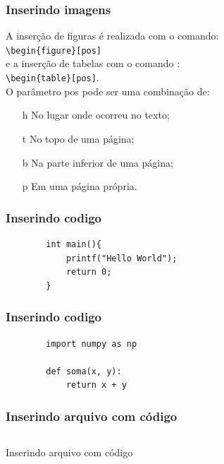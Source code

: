 \documentclass[compress]{beamer}
\newenvironment{code}{\captionsetup{type=listing}}{}
\begin{document}
\begin{frame}[fragile]{}
    \frametitle{Inserindo imagens}
    \justifying
     A inserção de figuras é realizada com o comando: \\
     \verb+\begin{figure}[pos]+ \\
     e a inserção de tabelas com o comando : \\
     \verb+\begin{table}[pos]+. \\
     O parâmetro pos pode ser uma combinação de:
    
    \begin{itemize}
        \item[h] No lugar onde ocorreu no texto;
        \item[t] No topo de uma página;
        \item[b] Na parte inferior de uma página;
        \item[p] Em uma página própria.
    \end{itemize}
\end{frame}

\begin{frame}[fragile]{}
    \frametitle{Inserindo codigo}
    \begin{verbatim}
        int main(){
            printf("Hello World");
            return 0;
        }
    \end{verbatim}
\end{frame}


\begin{frame}[fragile]{}
    \frametitle{Inserindo codigo}
    \begin{verbatim}
        import numpy as np
        
        def soma(x, y):
            return x + y
    \end{verbatim}
\end{frame}

\begin{frame}[fragile]{}
    \frametitle{Inserindo arquivo com código}
    \inputminted{c}{main.c}
\end{frame}

\begin{frame}[fragile]{Inserindo arquivo com código}
    \begin{code}
        \label{code:c-code}
        \inputminted[frame=lines,framesep=2mm,baselinestretch=1.2,bgcolor=LightGray,fontsize=\footnotesize,linenos]{c}{main.c}
       
    \end{code}
\end{frame}
\end{document}
